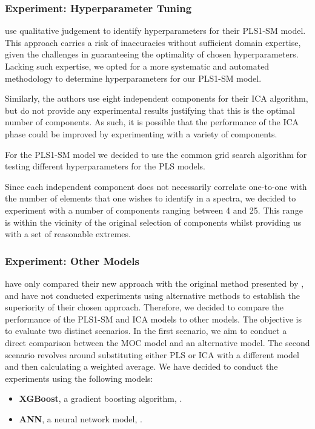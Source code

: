 \subsubsection{Experiment: Hyperparameter Tuning}\label{sec:experiment_hyperparameter_tuning}
\citet{cleggRecalibrationMarsScience2017} use qualitative judgement to identify hyperparameters for their PLS1-SM model.
This approach carries a risk of inaccuracies without sufficient domain expertise, given the challenges in guaranteeing the optimality of chosen hyperparameters.
Lacking such expertise, we opted for a more systematic and automated methodology to determine hyperparameters for our PLS1-SM model.

Similarly, the authors use eight independent components for their ICA algorithm, but do not provide any experimental results justifying that this is the optimal number of components.
As such, it is possible that the performance of the ICA phase could be improved by experimenting with a variety of components.

For the PLS1-SM model we decided to use the common grid search algorithm for testing different hyperparameters for the PLS models.

Since each independent component does not necessarily correlate one-to-one with the number of elements that one wishes to identify in a spectra, we decided to experiment with a number of components ranging between 4 and 25.
This range is within the vicinity of the original selection of components whilst providing us with a set of reasonable extremes.


\subsubsection{Experiment: Other Models}\label{sec:experiment_other_models}
\citet{cleggRecalibrationMarsScience2017} have only compared their new approach with the original method presented by \citet{wiensPreFlight3}, and have not conducted experiments using alternative methods to establish the superiority of their chosen approach.
Therefore, we decided to compare the performance of the PLS1-SM and ICA models to other models.
The objective is to evaluate two distinct scenarios. In the first scenario, we aim to conduct a direct comparison between the MOC model and an alternative model. The second scenario revolves around substituting either PLS or ICA with a different model and then calculating a weighted average.
We have decided to conduct the experiments using the following models:

\begin{itemize}
	\item \textbf{XGBoost}, a gradient boosting algorithm, \cite{chen_xgboost_2016}.
	\item \textbf{ANN}, a neural network model, \cite{scikit-learn}.
\end{itemize}
